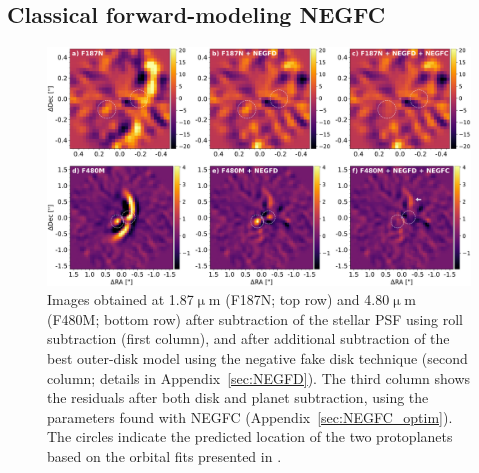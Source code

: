 \documentclass[longauth]{aa}
\begin{document}
\begin{appendix}
\subsection{Classical forward-modeling NEGFC}

    \begin{figure}[!t]
    \centering
    \includegraphics[width=\textwidth]{FigB1.pdf}
    \caption{Images obtained at 1.87$\upmu$m (F187N; top row) and 4.80$\upmu$m (F480M; bottom row) after subtraction of the stellar PSF using roll subtraction (first column), and after additional subtraction of the best outer-disk model using the negative fake disk technique (second column; details in Appendix~\ref{sec:NEGFD}). The third column shows the %
    residuals after both disk and planet subtraction, using the parameters found with NEGFC (Appendix~\ref{sec:NEGFC_optim}). The circles indicate the predicted location of the two protoplanets based on the orbital fits presented in \citet{Wang2021}.
    }
    \label{fig:NEGFD_and_NEGFC}
    \end{figure}


\end{appendix}
\end{document}
